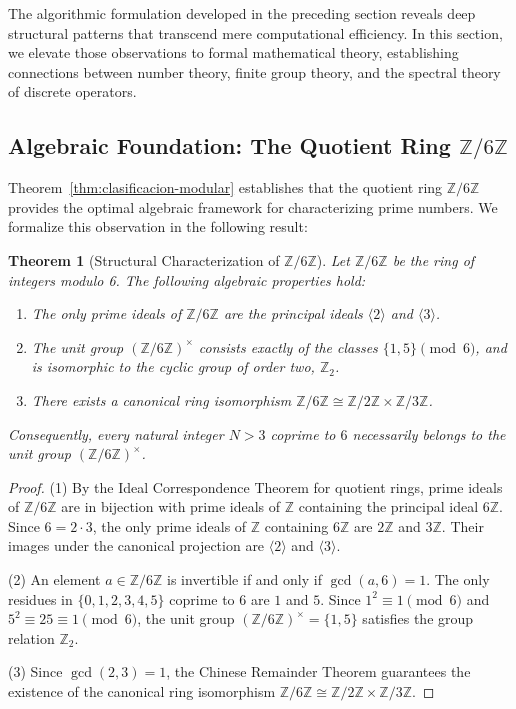 \documentclass{article}
\numberwithin{equation}{section}
\newcommand{\ZZ}{\mathbb{Z}}
\theoremstyle{plain}
\newtheorem{theorem}{Theorem}[section]
\theoremstyle{definition}
\begin{document}
The algorithmic formulation developed in the preceding section reveals deep structural patterns that transcend mere computational efficiency. In this section, we elevate those observations to formal mathematical theory, establishing connections between number theory, finite group theory, and the spectral theory of discrete operators.

\subsection{Algebraic Foundation: The Quotient Ring $\ZZ/6\ZZ$}

Theorem~\ref{thm:clasificacion-modular} establishes that the quotient ring $\ZZ/6\ZZ$ provides the optimal algebraic framework for characterizing prime numbers. We formalize this observation in the following result:

\begin{theorem}[Structural Characterization of $\ZZ/6\ZZ$]
\label{thm:caracterizacion-primos-Z6}
Let $\ZZ/6\ZZ$ be the ring of integers modulo 6. The following algebraic properties hold:
\begin{enumerate}
    \item The only prime ideals of $\ZZ/6\ZZ$ are the principal ideals $\langle 2 \rangle$ and $\langle 3 \rangle$.
    \item The unit group $(\ZZ/6\ZZ)^\times$ consists exactly of the classes $\{1, 5\} \pmod 6$, and is isomorphic to the cyclic group of order two, $\ZZ_2$.
    \item There exists a canonical ring isomorphism $\ZZ/6\ZZ \cong \ZZ/2\ZZ \times \ZZ/3\ZZ$.
\end{enumerate}
Consequently, every natural integer $N > 3$ coprime to $6$ necessarily belongs to the unit group $(\ZZ/6\ZZ)^\times$.
\end{theorem}

\begin{proof}
(1) By the Ideal Correspondence Theorem for quotient rings, prime ideals of $\ZZ/6\ZZ$ are in bijection with prime ideals of $\ZZ$ containing the principal ideal $6\ZZ$. Since $6 = 2 \cdot 3$, the only prime ideals of $\ZZ$ containing $6\ZZ$ are $2\ZZ$ and $3\ZZ$. Their images under the canonical projection are $\langle 2 \rangle$ and $\langle 3 \rangle$.

(2) An element $a \in \ZZ/6\ZZ$ is invertible if and only if $\gcd(a, 6) = 1$. The only residues in $\{0, 1, 2, 3, 4, 5\}$ coprime to $6$ are $1$ and $5$. Since $1^2 \equiv 1 \pmod 6$ and $5^2 \equiv 25 \equiv 1 \pmod 6$, the unit group $(\ZZ/6\ZZ)^\times = \{1, 5\}$ satisfies the group relation $\ZZ_2$.

(3) Since $\gcd(2, 3) = 1$, the Chinese Remainder Theorem guarantees the existence of the canonical ring isomorphism $\ZZ/6\ZZ \cong \ZZ/2\ZZ \times \ZZ/3\ZZ$.
\end{proof}
\end{document}
